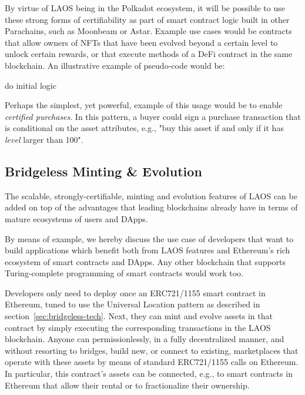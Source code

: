 By virtue of LAOS being in the Polkadot ecosystem, it will be possible
to use these strong forms of certifiability as part of smart contract logic
built in other Parachains, such as Moonbeam\cite{moonbeam} or Astar\cite{astar}.
Example use cases would be contracts that allow owners of 
NFTs that have been evolved beyond a certain level to unlock certain rewards,
or that execute methods of a DeFi contract in the same blockchain.
An illustrative example of pseudo-code would be:
\begin{algorithm}[H]
    do initial logic\;
\end{algorithm}

Perhaps the simplest, yet powerful, example of this usage would be to enable {\it certified purchases}.
In this pattern, a buyer could sign a purchase transaction that is conditional on the asset
attributes, e.g., "buy this asset if and only if it has {\it level} larger than 100".

\subsection{Bridgeless Minting \& Evolution}\label{sec:la-bridglessness}

The scalable, strongly-certifiable, minting and evolution features of LAOS
can be added on top of the advantages that leading blockchains already
have in terms of mature ecosystems of users and DApps.

By means of example, we hereby discuss the use case of developers that
want to build applications which benefit both from LAOS features and
Ethereum's rich ecosystem of smart contracts and DApps.
Any other blockchain that supports Turing-complete
programming of smart contracts would work too. 

Developers only need to deploy once
an ERC721/1155 smart contract in Ethereum,
tuned to use the Universal Location pattern as described
in section \ref{sec:bridgeless-tech}. Next, they can mint and evolve
assets in that contract by simply executing the corresponding transactions in the 
LAOS blockchain. Anyone can permissionlessly, in a fully decentralized manner,
and without resorting to bridges, build new, or connect to existing,
marketplaces that operate with these assets by means of standard
ERC721/1155 calls on Ethereum.
In particular, this contract's assets can be connected, e.g., to smart contracts
in Ethereum that allow their rental or to fractionalize their ownership.

